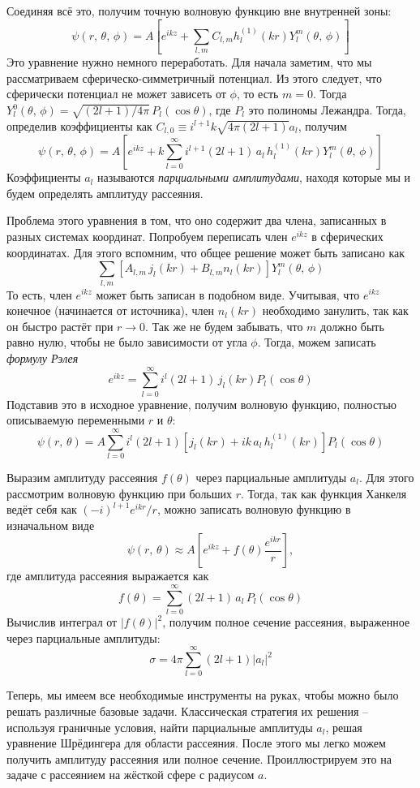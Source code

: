 Соединяя всё это, получим точную волновую функцию вне внутренней зоны:
\[
  \psi(r,\,\theta,\,\phi) = A\left[e^{ikz} + \sum\limits_{l, m} C_{l,m} h^{(1)}_l(kr) Y^m_l (\theta,\,\phi)\right]
\]
Это уравнение нужно немного переработать. Для начала заметим, что мы
рассматриваем сферическо-симметричный потенциал. Из этого следует, что
сферически потенциал не может зависеть от $\phi$, то есть $m=0$. Тогда
$Y^{0}_l(\theta,\, \phi) = \sqrt{(2l+1)/4\pi}\,P_l(\cos\theta)$, где $P_l$ это
полиномы Лежандра. Тогда, определив коэффициенты как $C_{l,0} \equiv
  i^{l+1}k\sqrt{4\pi(2l+1)}a_l$, получим
\[
  \psi(r,\,\theta,\,\phi) = A\left[e^{ikz} + k\sum\limits_{l=0}^{\infty}i^{l+1}(2l+1)\,a_l\,h^{(1)}_l(kr) Y^m_l (\theta,\,\phi)\right]
\]
Коэффициенты $a_l$ называются \textit{парциальными амплитудами}, находя которые
мы и будем определять амплитуду рассеяния.

Проблема этого уравнения в том, что оно содержит два члена, записанных в разных
системах координат. Попробуем переписать член $e^{ikz}$ в сферических
координатах. Для этого вспомним, что общее решение может быть записано как
\[
  \sum\limits_{l, m}\left[A_{l,m}\, j_l(kr) + B_{l, m} n_l(kr)\right]Y^{m}_{l}(\theta,\,\phi)
\]
То есть, член $e^{ikz}$ может быть записан в подобном виде. Учитывая, что
$e^{ikz}$ конечное (начинается от источника), член $n_l(kr)$ необходимо
занулить, так как он быстро растёт при $r\rightarrow 0$. Так же не будем
забывать, что $m$ должно быть равно нулю, чтобы не было зависимости от угла
$\phi$. Тогда, можем записать \textit{формулу Рэлея}
\[
  e^{ikz} = \sum\limits_{l=0}^{\infty} i^{l}(2l+1)\,j_l(kr)P_l(\cos\theta)
\]
Подставив это в исходное уравнение, получим волновую функцию, полностью
описываемую переменными $r$ и $\theta$:
\[
  \psi(r,\,\theta) = A\sum\limits_{l=0}^{\infty}i^{l}(2l+1)\left[j_l(kr) + ik\,a_l \, h^{(1)}_l(kr)\right]P_l(\cos\theta)
\]

Выразим амплитуду рассеяния $f(\theta)$ через парциальные амплитуды $a_l$. Для
этого рассмотрим волновую функцию при больших $r$. Тогда, так как функция
Ханкеля ведёт себя как $(-i)^{l+1}e^{ikr}/r$, можно записать волновую функцию в
изначальном виде
\[
  \psi(r,\, \theta) \approx A\left[ e^{ikz} + f(\theta)\frac{e^{ikr}}{r}\right],
\]
где амплитуда рассеяния выражается как
\[
  f(\theta) = \sum\limits_{l=0}^{\infty}(2l+1)\,a_l\,P_l(\cos\theta)
\]
Вычислив интеграл от $|f(\theta)|^2$, получим полное сечение рассеяния,
выраженное через парциальные амплитуды:
\[
  \sigma = 4\pi\sum_{l=0}^{\infty}(2l+1)|a_l|^2
\]

Теперь, мы имеем все необходимые инструменты на руках, чтобы можно было решать
различные базовые задачи. Классическая стратегия их решения -- используя
граничные условия, найти парциальные амплитуды $a_l$, решая уравнение
Шрёдингера для области рассеяния. После этого мы легко можем получить амплитуду
рассеяния или полное сечение. Проиллюстрируем это на задаче с рассеянием на
жёсткой сфере с радиусом $a$.

